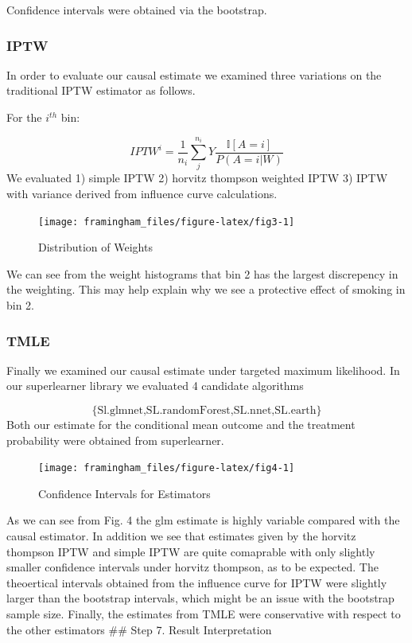 \documentclass[]{article}
\begin{document}
Confidence intervals were obtained via the bootstrap.

\subsubsection{IPTW}\label{iptw}

In order to evaluate our causal estimate we examined three variations on
the traditional IPTW estimator as follows.

For the \(i^{th}\) bin:

\[IPTW^i = \frac{1}{n_i} \sum_{j}^{n_i} Y\frac{ \mathbb{I} [A = i]}{P(A = i | W)}\]
We evaluated 1) simple IPTW 2) horvitz thompson weighted IPTW 3) IPTW
with variance derived from influence curve calculations.

\begin{figure}[H]

{\centering \texttt{[image: framingham\_files/figure-latex/fig3-1]} 

}

\caption{Distribution of Weights}\label{fig:fig3}
\end{figure}

We can see from the weight histograms that bin 2 has the largest
discrepency in the weighting. This may help explain why we see a
protective effect of smoking in bin 2.

\subsubsection{TMLE}\label{tmle}

Finally we examined our causal estimate under targeted maximum
likelihood. In our superlearner library we evaluated 4 candidate
algorithms

\[\{\text{Sl.glmnet,SL.randomForest,SL.nnet,SL.earth\}}\] Both our
estimate for the conditional mean outcome and the treatment probability
were obtained from superlearner.

\begin{figure}[H]

{\centering \texttt{[image: framingham\_files/figure-latex/fig4-1]} 

}

\caption{Confidence Intervals for Estimators}\label{fig:fig4}
\end{figure}

As we can see from Fig. 4 the glm estimate is highly variable compared
with the causal estimator. In addition we see that estimates given by
the horvitz thompson IPTW and simple IPTW are quite comaprable with only
slightly smaller confidence intervals under horvitz thompson, as to be
expected. The theoertical intervals obtained from the influence curve
for IPTW were slightly larger than the bootstrap intervals, which might
be an issue with the bootstrap sample size. Finally, the estimates from
TMLE were conservative with respect to the other estimators \#\# Step 7.
Result Interpretation
\end{document}
